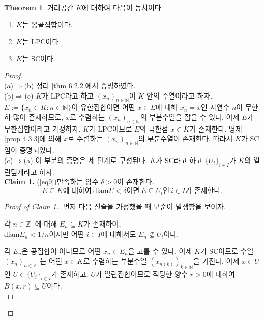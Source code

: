 \documentclass[11pt]{book}
\numberwithin{equation}{chapter}
\def\NN{\mathbb{N}}
\def\ZZ{\mathbb{Z}}
\def\diam{\text{diam}}
\theoremstyle{definition}
\newtheorem{thm}{Theorem}[section]
\newenvironment{enum}
	{\begin{enumerate}[label=(\alph*), leftmargin=2\parindent]}
	{\end{enumerate}}
\begin{document}
\begin{thm} \label{thm 6.2.4}
    거리공간 \(K\)에 대하여 다음이 동치이다.
    \begin{enum}
        \item \(K\)는 옹골집합이다.
        \item \(K\)는 LPC이다.
        \item \(K\)는 SC이다.
    \end{enum}
\end{thm}
\begin{proof}
    \quad\\
    (a)\(\Rightarrow\)(b) 정리 \ref{thm 6.2.2}에서 증명하였다.\\
    (b)\(\Rightarrow\)(c) \(K\)가 LPC라고 하고 \((x_n)_{n \in \NN}\)이 \(K\) 안의 수열이라고 하자. \(E := \{x_n \in K : n \in \NN\}\)이 유한집합이면 어떤 \(x \in E\)에 대해 \(x_n = x\)인 자연수 \(n\)이 무한히 많이 존재하므로, \(x\)로 수렴하는 \((x_n)_{n \in \NN}\)의 부분수열을 잡을 수 있다. 이제 \(E\)가 무한집합이라고 가정하자. \(K\)가 LPC이므로 \(E\)의 극한점 \(x \in K\)가 존재한다. 명제 \ref{prop 4.3.3}에 의해 \(x\)로 수렴하는 \((x_n)_{n \in \NN}\)의 부분수열이 존재한다. 따라서 \(K\)가 SC임이 증명되었다.\\
    (c)\(\Rightarrow\)(a) 이 부분의 증명은 세 단계로 구성된다. \(K\)가 SC라고 하고 \(\{U_i\}_{i \in I}\)가 \(K\)의 열린덮개라고 하자.\\
    \textbf{Claim 1.} (\ref{eq9})\를 만족하는 양수 \(\delta > 0\)이 존재한다.
    \begin{equation} \label{eq9}
        E \subseteq K\text{에 대하여} \ \diam E < \delta \text{이면} \ E \subseteq U_i \text{인} \ i \in I \text{가 존재한다.}
    \end{equation}
    \begin{proof}[Proof of Claim 1.]
        먼저 다음 진술을 가정했을 때 모순이 발생함을 보이자.
    \begin{center}
        각 \(n \in \ZZ_+\)에 대해 \(E_n \subseteq K\)가 존재하여,\\
        \(\diam E_n < 1/n\)이지만 어떤 \(i \in I\)에 대해서도 \(E_n \not\subseteq U_i\)이다.
    \end{center}
    각 \(E_n\)은 공집합이 아니므로 어떤 \(x_n \in E_n\)을 고를 수 있다. 이제 \(K\)가 SC이므로 수열 \((x_n)_{n \in \ZZ_+}\)는 어떤 \(x \in K\)로 수렴하는 부분수열 \((x_{n(k)})_{k \in \NN}\)을 가진다. 이제 \(x \in U\)인 \(U \in \{U_i\}_{i \in I}\)가 존재하고, \(U\)가 열린집합이므로 적당한 양수 \(r > 0\)에 대하여 \(B(x, r) \subseteq U\)이다.\\

\end{proof}
\end{proof}
\end{document}
